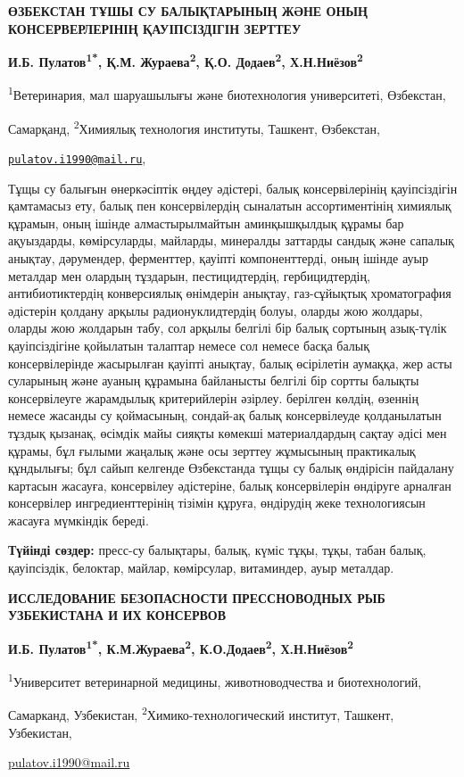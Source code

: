 \begin{center}
{\large\bfseries ӨЗБЕКСТАН ТҰШЫ СУ БАЛЫҚТАРЫНЫҢ ЖӘНЕ ОНЫҢ КОНСЕРВЕРЛЕРІНІҢ
ҚАУІПСІЗДІГІН ЗЕРТТЕУ}

{\bfseries И.Б. Пулатов\textsuperscript{1*}, Қ.М.
Жураева\textsuperscript{2}, Қ.О. Додаев\textsuperscript{2},
Х.Н.Ниёзов\textsuperscript{2}}

\textsuperscript{1}Ветеринария, мал шаруашылығы және биотехнология
университеті, Өзбекстан,

Самарқанд, \textsuperscript{2}Химиялық технология институты, Ташкент,
Өзбекстан,

\href{mailto:pulatov.i1990@mail.ru}{\nolinkurl{pulatov.i1990@mail.ru}},
\end{center}

Тұщы су балығын өнеркәсіптік өңдеу әдістері, балық консервілерінің
қауіпсіздігін қамтамасыз ету, балық пен консервілердің сыналатын
ассортиментінің химиялық құрамын, оның ішінде алмастырылмайтын
аминқышқылдық құрамы бар ақуыздарды, көмірсуларды, майларды, минералды
заттарды сандық және сапалық анықтау, дәрумендер, ферменттер, қауіпті
компоненттерді, оның ішінде ауыр металдар мен олардың тұздарын,
пестицидтердің, гербицидтердің, антибиотиктердің конверсиялық өнімдерін
анықтау, газ-сұйықтық хроматография әдістерін қолдану арқылы
радионуклидтердің болуы, оларды жою жолдары, оларды жою жолдарын табу,
сол арқылы белгілі бір балық сортының азық-түлік қауіпсіздігіне
қойылатын талаптар немесе сол немесе басқа балық консервілерінде
жасырылған қауіпті анықтау, балық өсірілетін аумаққа, жер асты суларының
және ауаның құрамына байланысты белгілі бір сортты балықты консервілеуге
жарамдылық критерийлерін әзірлеу. берілген көлдің, өзеннің немесе
жасанды су қоймасының, сондай-ақ балық консервілеуде қолданылатын тұздық
қызанақ, өсімдік майы сияқты көмекші материалдардың сақтау әдісі мен
құрамы, бұл ғылыми жаңалық және осы зерттеу жұмысының практикалық
құндылығы; бұл сайып келгенде Өзбекстанда тұщы су балық өндірісін
пайдалану картасын жасауға, консервілеу әдістеріне, балық консервілерін
өндіруге арналған консервілер ингредиенттерінің тізімін құруға,
өндірудің жеке технологиясын жасауға мүмкіндік береді.

{\bfseries Түйінді сөздер:} пресс-су балықтары, балық, күміс тұқы, тұқы,
табан балық, қауіпсіздік, белоктар, майлар, көмірсулар, витаминдер, ауыр
металдар.

\begin{center}
{\large\bfseries ИССЛЕДОВАНИЕ БЕЗОПАСНОСТИ ПРЕССНОВОДНЫХ РЫБ УЗБЕКИСТАНА И ИХ КОНСЕРВОВ}

{\bfseries И.Б. Пулатов\textsuperscript{1*},
К.М.Жураева\textsuperscript{2}, К.О.Додаев\textsuperscript{2},
Х.Н.Ниёзов\textsuperscript{2}}

\textsuperscript{1}Университет ветеринарной медицины, животноводчества и
биотехнологий,

Самарканд, Узбекистан, \textsuperscript{2}Химико-технологический
институт, Ташкент, Узбекистан,

\href{mailto:pulatov.i1990@mail.ru}{\ul{pulatov.i1990@mail.ru}}
\end{center}

